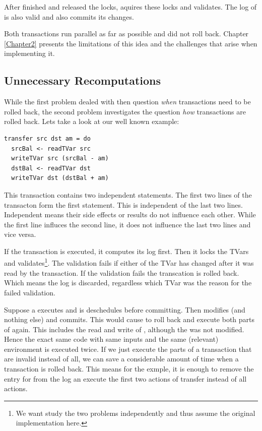After  finished and released the locks,  aquires these locks
and validates. The log of  is also valid and also commits its changes.

Both transactions run parallel as far as possible and did not roll back. Chapter \ref{Chapter2}
presents the limitations of this idea and the challenges that arise when implementing it.

\subsection{Unnecessary Recomputations}
\label{/UnRe} 	
While the first problem dealed with then question \textit{when} transactions need to be rolled back,
the second problem investigates the question \textit{how} transactions are rolled back. Lets take a 
look at our well known example:
\begin{lstlisting}
transfer src dst am = do 
  srcBal <- readTVar src	
  writeTVar src (srcBal - am)	
  dstBal <- readTVar dst	
  writeTVar dst (dstBal + am)	
\end{lstlisting}
This transaction contains two independent statements. The first two lines of the transacton form the first 
statement. This is independent of the last two lines. Independent means their side effects or results do not 
influence each other. While the first line influces the second line, it does not influence the last two lines
and vice versa. 

If the transaction is executed, it computes its log first. Then it locks the TVars and 
validates\footnote{We want study the two problems independently and thus assume the original implementation here.}. 
The validation fails if either of the TVar has changed after it was read by the transaction.
If the validation fails the transcation is rolled back. Which means the log is discarded,
regardless which TVar was the reason for the failed validation. 

Suppose a  executes  and is deschedules before committing.
Then  modifies  (and nothing else) and commits. This would cause 
to roll back and execute both parts of  again. This includes the read and write of , although 
the  was not modified. Hence the exact same code with same inputs and the same (relevant) environment 
is executed twice. If we just execute the parts of a transaction that are invalid instead of all, we can save a 
considerable amount of time when a transaction is rolled back. This means for the exmple, it is enough to remove 
the entry for  from the log an execute the first two actions of transfer instead of all actions.

